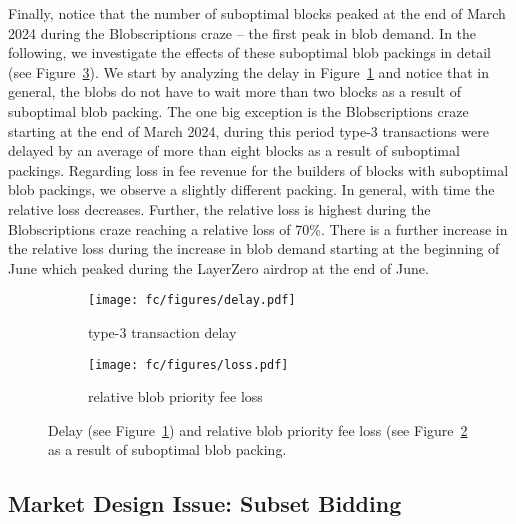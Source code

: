 Finally, notice that the number of suboptimal blocks peaked at the end of March 2024 during the Blobscriptions craze -- the first peak in blob demand. In the following, we investigate the effects of these suboptimal blob packings in detail (see Figure~\ref{fig:issues}). We start by analyzing the delay in Figure~\ref{fig:delay} and notice that in general, the blobs do not have to wait more than two blocks as a result of suboptimal blob packing. The one big exception is the Blobscriptions craze starting at the end of March 2024, during this period type-3 transactions were delayed by an average of more than eight blocks as a result of suboptimal packings. Regarding loss in fee revenue for the builders of blocks with suboptimal blob packings, we observe a slightly different packing. In general, with time the relative loss decreases. Further, the relative loss is highest during the Blobscriptions craze reaching a relative loss of 70\%. There is a further increase in the relative loss during the increase in blob demand starting at the beginning of June which peaked during the LayerZero airdrop at the end of June. 







\begin{figure}[t!]\vspace{-6pt}
    \centering
    \begin{subfigure}[t]{0.49\columnwidth}
    \centering
        \texttt{[image: fc/figures/delay.pdf]}
    \caption{type-3 transaction delay}
    \label{fig:delay}
    \end{subfigure}\hfill
    \begin{subfigure}[t]{0.49\columnwidth}
    \centering
        \texttt{[image: fc/figures/loss.pdf]}
    \caption{relative blob priority fee loss}
    \label{fig:loss}
    \end{subfigure}\vspace{-6pt}
    \caption{Delay (see Figure~\ref{fig:delay}) and relative blob priority fee loss (see Figure~\ref{fig:loss} as a result of suboptimal blob packing. }\label{fig:issues}
\end{figure}



\subsection{Market Design Issue: Subset Bidding}
\label{subsec:market}

